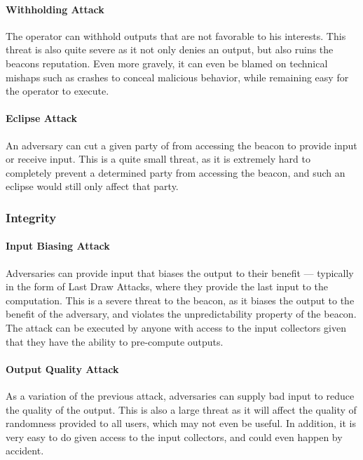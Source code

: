 \paragraph{Withholding Attack} The operator can withhold outputs that are not favorable to his interests. This threat is also quite severe as it not only denies an output, but also ruins the beacons reputation. Even more gravely, it can even be blamed on technical mishaps such as crashes to conceal malicious behavior, while remaining easy for the operator to execute.
\paragraph{Eclipse Attack} An adversary can cut a given party of from accessing the beacon to provide input or receive input. This is a quite small threat, as it is extremely hard to completely prevent a determined party from accessing the beacon, and such an eclipse would still only affect that party.


\subsubsection{Integrity}

\paragraph{Input Biasing Attack} Adversaries can provide input that biases the output to their benefit --- typically in the form of Last Draw Attacks, where they provide the last input to the computation. This is a severe threat to the beacon, as it biases the output to the benefit of the adversary, and violates the unpredictability property of the beacon. The attack can be executed by anyone with access to the input collectors given that they have the ability to pre-compute outputs.
\paragraph{Output Quality Attack} As a variation of the previous attack, adversaries can supply bad input to reduce the quality of the output. This is also a large threat as it will affect the quality of randomness provided to all users, which may not even be useful. In addition, it is very easy to do given access to the input collectors, and could even happen by accident.
